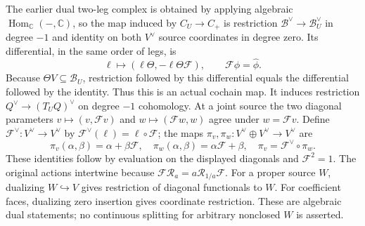 The earlier dual two-leg complex is obtained by applying algebraic
$\operatorname{Hom}_{\mathbb C}(-,\mathbb C)$, so the map induced
by $C_U\to C_+$ is restriction $\mathscr B^\vee\to\mathscr B_U^\vee$
in degree $-1$ and identity on both $V^\vee$ source coordinates in
degree zero.  Its differential, in the same order of legs, is
\[
\ell\longmapsto(\ell\Theta,-\ell\Theta\mathcal F),
\qquad \mathcal F\phi=\widehat\phi.
\tag{MCF45}
\]
Because $\Theta V\subseteq\mathscr B_U$, restriction followed by
this differential equals the differential followed by the identity.
Thus this is an actual cochain map.  It induces restriction
$Q^\vee\to(T_UQ)^\vee$ on degree $-1$ cohomology.  At a joint
source the two diagonal parameters $v\mapsto(v,\mathcal Fv)$ and
$w\mapsto(\mathcal Fw,w)$ agree under $w=\mathcal Fv$. Define
$\mathcal F^\vee:V^\vee\to V^\vee$ by
$\mathcal F^\vee(\ell)=\ell\circ\mathcal F$; the maps
$\pi_v,\pi_w:V^\vee\oplus V^\vee\to V^\vee$ are
\[
\pi_v(\alpha,\beta)=\alpha+\beta\mathcal F,
\quad \pi_w(\alpha,\beta)=\alpha\mathcal F+\beta,
\quad \pi_v=\mathcal F^\vee\circ\pi_w.
\tag{MCF46}
\]
These identities follow by evaluation on the displayed diagonals
and $\mathcal F^2=1$.  The original actions intertwine because
$\mathcal F\mathcal R_a=a\mathcal R_{1/a}\mathcal F$.
For a proper source $W$, dualizing $W\hookrightarrow V$ gives
restriction of diagonal functionals to $W$.  For coefficient faces,
dualizing zero insertion gives coordinate restriction.  These are
algebraic dual statements; no continuous splitting for arbitrary
nonclosed $W$ is asserted.
